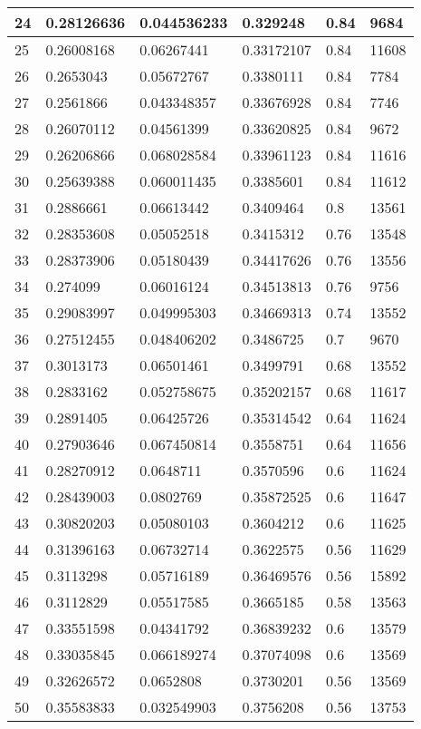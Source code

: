 \begin{longtable}{|l|l|l|l|l|l|}
24 & 0.28126636 & 0.044536233 & 0.329248 & 0.84 & 9684 \\ \hline 
25 & 0.26008168 & 0.06267441 & 0.33172107 & 0.84 & 11608 \\ \hline 
26 & 0.2653043 & 0.05672767 & 0.3380111 & 0.84 & 7784 \\ \hline 
27 & 0.2561866 & 0.043348357 & 0.33676928 & 0.84 & 7746 \\ \hline 
28 & 0.26070112 & 0.04561399 & 0.33620825 & 0.84 & 9672 \\ \hline 
29 & 0.26206866 & 0.068028584 & 0.33961123 & 0.84 & 11616 \\ \hline 
30 & 0.25639388 & 0.060011435 & 0.3385601 & 0.84 & 11612 \\ \hline 
31 & 0.2886661 & 0.06613442 & 0.3409464 & 0.8 & 13561 \\ \hline 
32 & 0.28353608 & 0.05052518 & 0.3415312 & 0.76 & 13548 \\ \hline 
33 & 0.28373906 & 0.05180439 & 0.34417626 & 0.76 & 13556 \\ \hline 
34 & 0.274099 & 0.06016124 & 0.34513813 & 0.76 & 9756 \\ \hline 
35 & 0.29083997 & 0.049995303 & 0.34669313 & 0.74 & 13552 \\ \hline 
36 & 0.27512455 & 0.048406202 & 0.3486725 & 0.7 & 9670 \\ \hline 
37 & 0.3013173 & 0.06501461 & 0.3499791 & 0.68 & 13552 \\ \hline 
38 & 0.2833162 & 0.052758675 & 0.35202157 & 0.68 & 11617 \\ \hline 
39 & 0.2891405 & 0.06425726 & 0.35314542 & 0.64 & 11624 \\ \hline 
40 & 0.27903646 & 0.067450814 & 0.3558751 & 0.64 & 11656 \\ \hline 
41 & 0.28270912 & 0.0648711 & 0.3570596 & 0.6 & 11624 \\ \hline 
42 & 0.28439003 & 0.0802769 & 0.35872525 & 0.6 & 11647 \\ \hline 
43 & 0.30820203 & 0.05080103 & 0.3604212 & 0.6 & 11625 \\ \hline 
44 & 0.31396163 & 0.06732714 & 0.3622575 & 0.56 & 11629 \\ \hline 
45 & 0.3113298 & 0.05716189 & 0.36469576 & 0.56 & 15892 \\ \hline 
46 & 0.3112829 & 0.05517585 & 0.3665185 & 0.58 & 13563 \\ \hline 
47 & 0.33551598 & 0.04341792 & 0.36839232 & 0.6 & 13579 \\ \hline 
48 & 0.33035845 & 0.066189274 & 0.37074098 & 0.6 & 13569 \\ \hline 
49 & 0.32626572 & 0.0652808 & 0.3730201 & 0.56 & 13569 \\ \hline 
50 & 0.35583833 & 0.032549903 & 0.3756208 & 0.56 & 13753 \\ \hline 
\end{longtable}